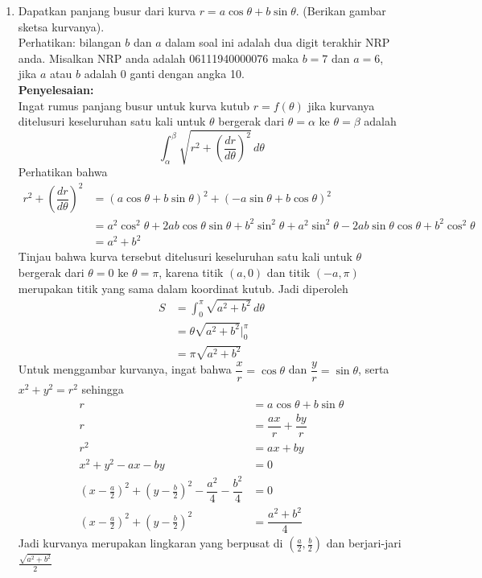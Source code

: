 \documentclass{article}
\begin{document}
\begin{enumerate}
\begin{enumerate}
	\end{enumerate}
	\item Dapatkan panjang busur dari kurva $r=a\cos \theta+b\sin\theta$. (Berikan gambar sketsa kurvanya).\\
	Perhatikan: bilangan $b$ dan $a$ dalam soal ini adalah dua digit terakhir NRP anda. Misalkan NRP anda adalah 06111940000076 maka $b=7$ dan $a=6$, jika $a$ atau $b$ adalah 0 ganti dengan angka 10.\\
	\textbf{Penyelesaian:}\\
	Ingat rumus panjang busur untuk kurva kutub $r=f(\theta)$ jika kurvanya ditelusuri keseluruhan satu kali untuk $\theta$ bergerak dari $\theta=\alpha$ ke $\theta=\beta$ adalah 
	$$ \int_{\alpha}^{\beta}\sqrt{r^2+\left(\dfrac{dr}{d\theta}\right)^2} \, d\theta $$
	Perhatikan bahwa
	\begin{align*}
	r^2 + \left(\dfrac{dr}{d\theta}\right)^2 &= ( a\cos \theta+b\sin\theta)^2+(-a\sin \theta+b\cos\theta)^2\\
	&= a^2\cos^2 \theta+2ab\cos\theta\sin\theta+b^2\sin^2\theta+a^2\sin^2\theta-2ab\sin\theta\cos\theta+b^2\cos^2\theta\\
	&= a^2+b^2
	\end{align*}
	Tinjau bahwa kurva tersebut ditelusuri keseluruhan satu kali untuk $\theta$ bergerak dari $\theta=0$ ke $\theta=\pi$, karena titik $(a,0)$ dan titik $(-a,\pi)$ merupakan titik yang sama dalam koordinat kutub. Jadi diperoleh 
	\begin{align*}
	S &= \int_0^\pi \sqrt{a^2+b^2}\, d\theta\\
	&= \theta\sqrt{a^2+b^2}\big|^\pi_0\\
	&= \pi\sqrt{a^2+b^2} 
	\end{align*}
	Untuk menggambar kurvanya, ingat bahwa $\dfrac{x}{r}=\cos \theta$ dan $\dfrac{y}{r}=\sin \theta$, serta $x^2+y^2=r^2$ sehingga
	\begin{align*}
	r &= a\cos\theta+b\sin\theta\\
	r &= \dfrac{ax}{r}+\dfrac{by}{r}\\
	r^2 &= ax+by\\
	x^2+y^2-ax-by &= 0 \\
	\left(x-\frac{a}{2}\right)^2+\left(y-\frac{b}{2}\right)^2 -\dfrac{a^2}{4}-\dfrac{b^2}{4} &= 0\\
	\left(x-\frac{a}{2}\right)^2+\left(y-\frac{b}{2}\right)^2 &= \dfrac{a^2+b^2}{4}
	\end{align*}
	Jadi kurvanya merupakan lingkaran yang berpusat di $\left(\frac{a}{2},\frac{b}{2}\right)$ dan berjari-jari $\frac{\sqrt{a^2+b^2}}{2}$\\

\end{enumerate}
\end{document}
